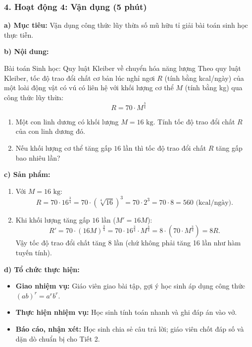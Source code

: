 \documentclass[12pt, a4paper]{article}
\begin{document}
\subsubsection*{4. Hoạt động 4: Vận dụng (5 phút)}

\noindent \textbf{a) Mục tiêu:}
Vận dụng công thức lũy thừa số mũ hữu tỉ giải bài toán sinh học thực tiễn.

\noindent \textbf{b) Nội dung:}
\begin{stembox}{Bài toán Sinh học: Quy luật Kleiber về chuyển hóa năng lượng}
Theo quy luật Kleiber, tốc độ trao đổi chất cơ bản lúc nghỉ ngơi $R$ (tính bằng kcal/ngày) của một loài động vật có vú có liên hệ với khối lượng cơ thể $M$ (tính bằng kg) qua công thức lũy thừa:
$$R = 70 \cdot M^{\frac{3}{4}}$$
\begin{enumerate}[leftmargin=0.6cm]
    \item Một con linh dương có khối lượng $M = 16\text{ kg}$. Tính tốc độ trao đổi chất $R$ của con linh dương đó.
    \item Nếu khối lượng cơ thể tăng gấp $16$ lần thì tốc độ trao đổi chất $R$ tăng gấp bao nhiêu lần?
\end{enumerate}
\end{stembox}

\noindent \textbf{c) Sản phẩm:}
\begin{enumerate}[leftmargin=0.6cm]
    \item Với $M = 16\text{ kg}$:
    $$R = 70 \cdot 16^{\frac{3}{4}} = 70 \cdot (\sqrt[4]{16})^3 = 70 \cdot 2^3 = 70 \cdot 8 = 560\text{ (kcal/ngày)}.$$
    \item Khi khối lượng tăng gấp $16$ lần ($M' = 16M$):
    $$R' = 70 \cdot (16M)^{\frac{3}{4}} = 70 \cdot 16^{\frac{3}{4}} \cdot M^{\frac{3}{4}} = 8 \cdot \left(70 \cdot M^{\frac{3}{4}}\right) = 8R.$$
    Vậy tốc độ trao đổi chất tăng $8$ lần (chứ không phải tăng 16 lần như hàm tuyến tính).
\end{enumerate}

\noindent \textbf{d) Tổ chức thực hiện:}
\begin{itemize}[leftmargin=0.6cm]
    \item \textbf{Giao nhiệm vụ:} Giáo viên giao bài tập, gợi ý học sinh áp dụng công thức $(ab)^r = a^r b^r$.
    \item \textbf{Thực hiện nhiệm vụ:} Học sinh tính toán nhanh và ghi đáp án vào vở.
    \item \textbf{Báo cáo, nhận xét:} Học sinh chia sẻ câu trả lời; giáo viên chốt đáp số và dặn dò chuẩn bị cho Tiết 2.
\end{itemize}
\end{document}
